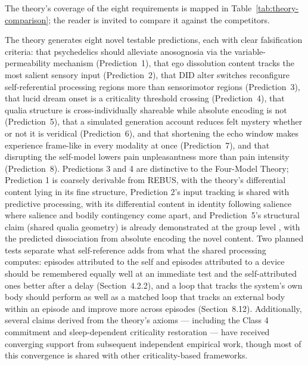 \documentclass[12pt]{article}
\newcommand{\revstart}{}
\begin{document}
{\revstart The theory's coverage of the eight requirements is mapped in Table~\ref{tab:theory-comparison}; the reader is invited to compare it against the competitors.

The theory generates eight novel testable predictions, each with clear falsification criteria: that psychedelics should alleviate anosognosia via the variable-permeability mechanism (Prediction~1), that ego dissolution content tracks the most salient sensory input (Prediction~2), that DID alter switches reconfigure self-referential processing regions more than sensorimotor regions (Prediction~3), that lucid dream onset is a criticality threshold crossing (Prediction~4), that qualia structure is cross-individually shareable while absolute encoding is not (Prediction~5), that a simulated generation account reduces felt mystery whether or not it is veridical (Prediction~6), and that shortening the echo window makes experience frame-like in every modality at once (Prediction~7), and that disrupting the self-model lowers pain unpleasantness more than pain intensity (Prediction~8). Predictions 3 and 4 are distinctive to the Four-Model Theory; Prediction 1 is coarsely derivable from REBUS, with the theory's differential content lying in its fine structure, Prediction 2's input tracking is shared with predictive processing, with its differential content in identity following salience where salience and bodily contingency come apart, and Prediction~5's structural claim (shared qualia geometry) is already demonstrated at the group level \citep{Kawakita2025}, with the predicted dissociation from absolute encoding the novel content. Two planned tests separate what self-reference adds from what the shared processing computes: episodes attributed to the self and episodes attributed to a device should be remembered equally well at an immediate test and the self-attributed ones better after a delay (Section~4.2.2), and a loop that tracks the system's own body should perform as well as a matched loop that tracks an external body within an episode and improve more across episodes (Section~8.12). Additionally, several claims derived from the theory's axioms --- including the Class 4 commitment and sleep-dependent criticality restoration --- have received converging support from subsequent independent empirical work, though most of this convergence is shared with other criticality-based frameworks.

}
\end{document}
